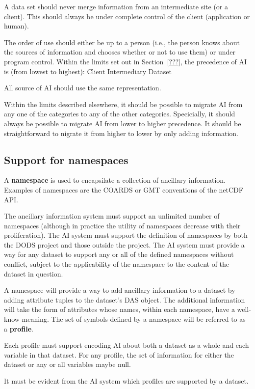 A data set should never merge information from an intermediate site
(or a client). This should always be under complete control of the
client (application or human). 

The order of use should either be up to a person (i.e., the person
knows about the sources of information and chooses whether or not to
use them) or under program control. Within the limits set out in
Section~\ref{???}, the precedence of AI is (from lowest to highest):
Client
Intermediary
Dataset

All source of AI should use the same representation.

Within the limits described elsewhere, it should be possible to
migrate AI from any one of the categories to any of the other
categories. Specicially, it should always be possible to migrate AI
from lower to higher precedence. It should be straightforward to
nigrate it from higher to lower by only adding information.

\subsection{Support for namespaces}
A \textbf{namespace} is used to encapsilate a collection of ancillary
information. Examples of namespaces are the COARDS or GMT conventions
of the netCDF API. 

The ancillary information system must support an unlimited number of
namespaces (although in practice the utility of namespaces decrease
with their proliferation). The AI system must support the definition
of namespaces by both the DODS project and those outside the project.
The AI system must provide a way for any dataset to support any or all
of the defined namespaces without conflict, subject to the
applicability of the namespace to the content of the dataset in
question.

A namespace will provide a way to add ancillary information to a
dataset by adding attribute tuples to the dataset's DAS object. The
additional information will take the form of attributes whose names,
within each namespace, have a well-know meaning. The set of symbols
defined by a namespace will be referred to as a \textbf{profile}.

Each profile must support encoding AI about both a dataset as a
whole and each variable in that dataset. For any profile, the set of
information for either the dataset or any or all variables maybe null.

It must be evident from the AI system which profiles are supported
by a dataset.


